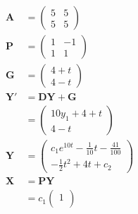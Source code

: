 \documentclass{article}
\begin{document}
\begin{align*}
  \mathbf{A}  & = \begin{pmatrix}
                    5 & 5 \\
                    5 & 5
                  \end{pmatrix}                                                                                                                   \\
  \mathbf{P}  & = \begin{pmatrix}
                    1 & -1 \\
                    1 & 1
                  \end{pmatrix}                                                                                                                   \\
  \mathbf{G}  & = \begin{pmatrix}
                    4 + t \\
                    4 - t
                  \end{pmatrix}                                                                                                                   \\
  \mathbf{Y}' & = \mathbf{D Y + G}                                                                                                                 \\
              & = \begin{pmatrix}
                    10 y_1 + 4 + t \\
                    4 - t
                  \end{pmatrix}                                                                                                                   \\
  \mathbf{Y}  & = \begin{pmatrix}
                    c_1 e^{10 t} - \frac{1}{10} t - \frac{41}{100} \\
                    -\frac{1}{2} t^2 + 4t + c_2
                  \end{pmatrix}                                                                                   \\
  \mathbf{X}  & = \mathbf{P Y}                                                                                                                     \\
              & = c_1 \begin{pmatrix}
                        1 \\

\end{pmatrix}
\end{align*}
\end{document}
